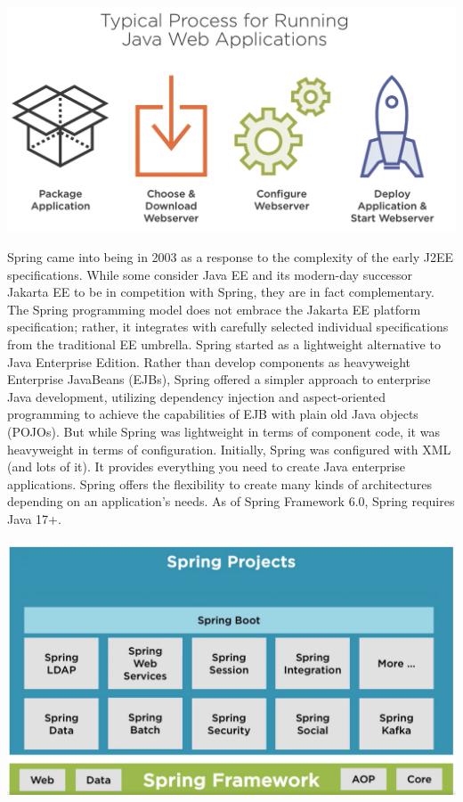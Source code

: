 \documentclass[a4paper, 12pt]{report}
\begin{document}
\includegraphics[width=\textwidth]{./images/chapter1/before_spring_boot.png} 

Spring came into being in 2003 as a response to the complexity of the early J2EE specifications. While some consider Java EE and its modern-day successor Jakarta EE to be in competition with Spring, they are in fact complementary. The Spring programming model does not embrace the Jakarta EE platform specification; rather, it integrates with carefully selected individual specifications from the traditional EE umbrella. Spring started as a lightweight alternative to Java Enterprise Edition. Rather than develop components as heavyweight Enterprise
JavaBeans (EJBs), Spring offered a simpler approach to enterprise Java development, utilizing dependency injection and aspect-oriented programming to achieve the capabilities of EJB with plain old Java objects (POJOs).
But while Spring was lightweight in terms of component code, it was heavyweight in terms of configuration. Initially, Spring was configured with XML (and lots of it).
It provides everything you need to create Java enterprise applications. Spring offers the flexibility to create many kinds of architectures depending on an application’s needs. As of Spring Framework 6.0, Spring requires Java 17+.

\includegraphics[width=\textwidth]{./images/chapter1/spring_framework.png} 
\end{document}
